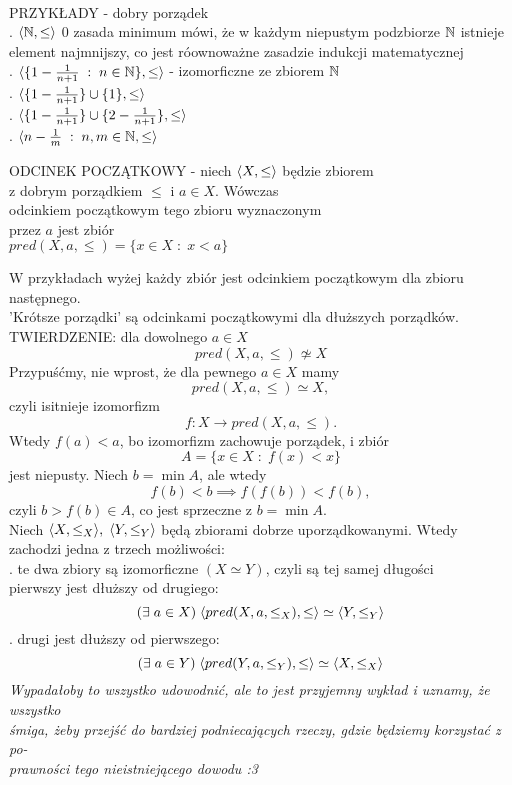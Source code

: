 \bigskip\\
{\color{acc}PRZYKŁADY} - dobry porządek\medskip\\
. $\langle\mathbb{N},\leq\rangle$ 0 zasada minimum mówi, że w każdym niepustym podzbiorze $\mathbb{N}$ istnieje element najmnijszy, co jest róownoważne zasadzie indukcji matematycznej\smallskip\\
. $\langle \{1-\frac1{n+1}\;:\;n\in\mathbb{N}\}, \leq\rangle$ - izomorficzne ze zbiorem $\mathbb{N}$\smallskip\\
. $\langle \{1-\frac 1{n+1}\}\cup\{1\}, \leq\rangle$\smallskip\\
. $\langle \{1-\frac 1{n+1}\}\cup\{2-\frac 1{n+1}\}, \leq\rangle$\smallskip\\
. $\langle n-\frac1m\;:\;n,m\in\mathbb{N},\leq\rangle$\bigskip\\
\bigskip
\begin{center}\large
    {\color{def}ODCINEK POCZĄTKOWY} - niech $\langle X,\leq\rangle$ będzie zbiorem \\z dobrym porządkiem $\leq$ i $a\in X$. Wówczas \\odcinkiem początkowym tego zbioru wyznaczonym \\przez $a$ jest zbiór\smallskip\\
    $pred(X, a,\leq)=\{x\in X\;:\;x<a\}$
\end{center}
W przykładach wyżej każdy zbiór jest odcinkiem początkowym dla zbioru następnego. \\'Krótsze porządki' są odcinkami początkowymi dla dłuższych porządków.\bigskip\\
{\large\color{acc}TWIERDZENIE:} dla dowolnego $a\in X$
$$pred(X, a, \leq)\not\simeq X$$
\dowod
Przypuśćmy, nie wprost, że dla pewnego $a\in X$ mamy
$$pred(X, a,\leq)\simeq X,$$
czyli isitnieje izomorfizm
$$f:X\to pred(X, a,\leq).$$
Wtedy $f(a)<a$, bo izomorfizm zachowuje porządek, i zbiór
$$A=\{x\in X\;:\;f(x)<x\}$$
jest niepusty. Niech $b=\min A$, ale wtedy
$$f(b)<b\implies f(f(b))<f(b),$$
czyli $b>f(b)\in A$, co jest sprzeczne z $b=\min A$.
\kondow
{}\bigskip\\
Niech $\langle X, \leq_X\rangle,\;\langle Y,\leq_Y\rangle$ będą zbiorami dobrze uporządkowanymi. Wtedy zachodzi jedna z trzech możliwości:\smallskip\\
. te dwa zbiory są {\color{acc}izomorficzne} $(X\simeq Y)$, czyli są tej samej długości\smallskip\\
\indent pierwszy jest dłuższy od drugiego:
$$(\exists\;a\in X)\;\langle pred(X, a, \leq_X), \leq\rangle\simeq \langle Y,\leq_Y\rangle$$
. drugi jest dłuższy od pierwszego:
$$(\exists\;a\in Y)\;\langle pred (Y, a, \leq_Y), \leq\rangle\simeq \langle X, \leq_X\rangle$$
\emph{Wypadałoby to wszystko udowodnić, ale to jest przyjemny wykład i uznamy, że wszystko \\śmiga, żeby przejść do bardziej podniecających rzeczy, gdzie będziemy korzystać z po-\\prawności tego nieistniejącego dowodu :3}
